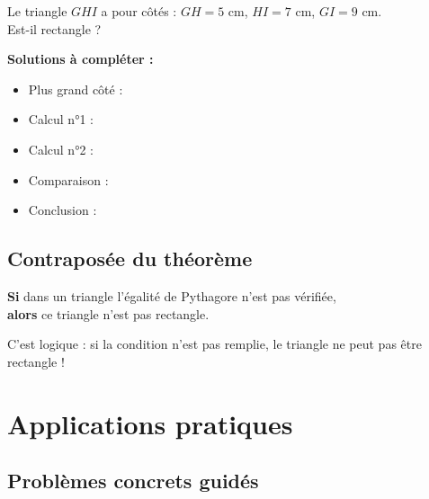 \begin{examplebox}[À compléter]
	Le triangle $GHI$ a pour côtés : $GH = 5$ cm, $HI = 7$ cm, $GI = 9$ cm.\\
	Est-il rectangle ?
	
	\vspace{0.5cm}
	\textbf{Solutions à compléter :}
	\begin{itemize}
		\item Plus grand côté : \dotfill
		\item Calcul n°1 : \dotfill
		\item Calcul n°2 : \dotfill
		\item Comparaison : \dotfill
		\item Conclusion : \dotfill
	\end{itemize}
\end{examplebox}

\subsection{Contraposée du théorème}

\begin{proprietebox}
	\textbf{Si} dans un triangle l'égalité de Pythagore n'est pas vérifiée,\\
	\textbf{alors} ce triangle n'est pas rectangle.
	
	\medskip
	C'est logique : si la condition n'est pas remplie, le triangle ne peut pas être rectangle !
\end{proprietebox}

\section{Applications pratiques}

\subsection{Problèmes concrets guidés}

